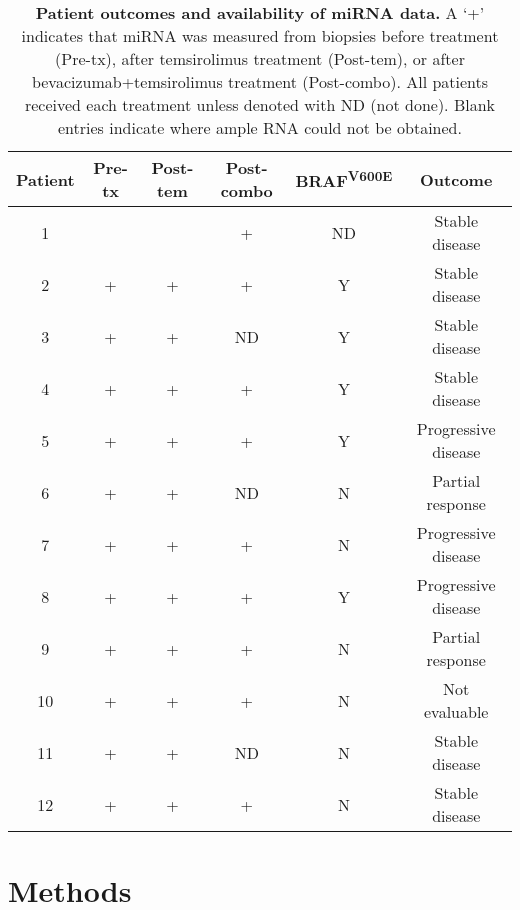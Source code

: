 \begin{table}[h]
\begin{center}
\begin{tabular}{ c c c c c c }
Patient & Pre-tx & Post-tem & Post-combo & BRAF\textsuperscript{V600E} & Outcome \\ \hline
1 &   &   & + & ND    & Stable disease \\
2 & + & + & + & Y & Stable disease \\
3 & + & + & ND & Y & Stable disease \\
4 & + & + & + & Y & Stable disease \\
5 & + & + & + & Y & Progressive disease \\
6 & + & + & ND & N & Partial response \\
7 & + & + & + & N & Progressive disease \\
8 & + & + & + & Y & Progressive disease \\
9 & + & + & + & N & Partial response \\
10 & + & + & + & N & Not evaluable \\
11 & + & + & ND & N & Stable disease \\
12 & + & + & + & N & Stable disease \\
\end{tabular}
\end{center}
\caption[Patient outcomes and availability of miRNA data]{
    \textbf{Patient outcomes and availability of miRNA data.}
    A `+' indicates that miRNA was measured from biopsies 
    before treatment (Pre-tx), after temsirolimus treatment (Post-tem),
    or after bevacizumab+temsirolimus treatment (Post-combo). All patients
    received each treatment unless denoted with ND (not done). Blank entries indicate where
    ample RNA could not be obtained.}
\label{jtm:table1}
\end{table}

\section{Methods}

